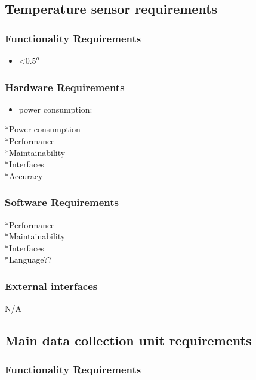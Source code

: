 \subsection{Temperature sensor requirements}

\subsubsection{Functionality Requirements}
\begin{itemize}
\item {}  <$0.5^o$

\end{itemize}	
\subsubsection{Hardware Requirements}
\begin{itemize}
\item power consumption: 
\end{itemize}
*Power consumption\\
*Performance\\
*Maintainability\\
*Interfaces\\
*Accuracy\\
\subsubsection{Software Requirements}
*Performance\\
*Maintainability\\
*Interfaces\\
*Language??\\

\subsubsection{External interfaces}
N/A
\subsection{Main data collection unit requirements}

\subsubsection{Functionality Requirements}


